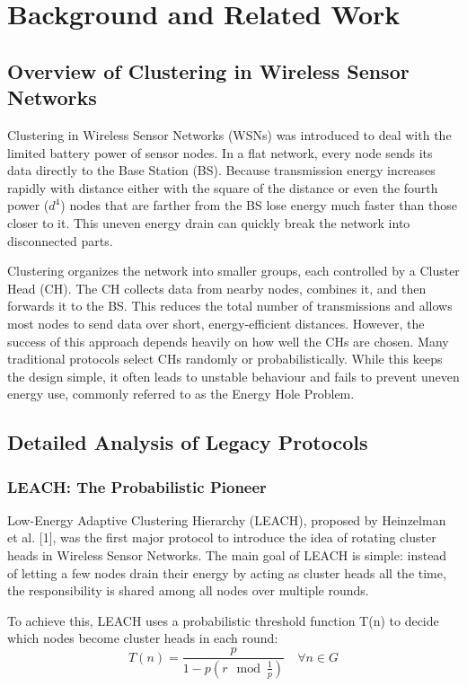 \documentclass[conference]{IEEEtran}
\begin{document}
\section{Background and Related Work}

\subsection{Overview of Clustering in Wireless Sensor Networks}
Clustering in Wireless Sensor Networks (WSNs) was introduced to deal with the limited battery power of sensor nodes. In a flat network, every node sends its data directly to the Base Station (BS). Because transmission energy increases rapidly with distance either with the square of the distance or even the fourth power ($d^4$) nodes that are farther from the BS lose energy much faster than those closer to it. This uneven energy drain can quickly break the network into disconnected parts.

Clustering organizes the network into smaller groups, each controlled by a Cluster Head (CH). The CH collects data from nearby nodes, combines it, and then forwards it to the BS. This reduces the total number of transmissions and allows most nodes to send data over short, energy-efficient distances. However, the success of this approach depends heavily on how well the CHs are chosen. Many traditional protocols select CHs randomly or probabilistically. While this keeps the design simple, it often leads to unstable behaviour and fails to prevent uneven energy use, commonly referred to as the Energy Hole Problem.

\subsection{Detailed Analysis of Legacy Protocols}

\subsubsection{LEACH: The Probabilistic Pioneer}
Low-Energy Adaptive Clustering Hierarchy (LEACH), proposed by Heinzelman et al. [1], was the first major protocol to introduce the idea of rotating cluster heads in Wireless Sensor Networks. The main goal of LEACH is simple: instead of letting a few nodes drain their energy by acting as cluster heads all the time, the responsibility is shared among all nodes over multiple rounds.

To achieve this, LEACH uses a probabilistic threshold function T(n) to decide which nodes become cluster heads in each round:
\begin{equation}
T(n) = \frac{p}{1 - p(r \mod \frac{1}{p})} \quad \forall n \in G
\end{equation}
\end{document}
